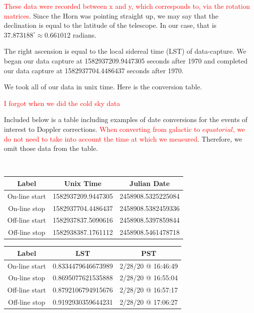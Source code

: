 \documentclass[12pt]{article}
\begin{document}
\textcolor{red}{These data were recorded between x and y, which corresponds to, via the rotation matrices}. Since the Horn was pointing straight up, we may say that the declination is equal to the latitude of the telescope. In our case, that is $37.873188^\circ \approx 0.661012$ radians.

The right ascension is equal to the local sidereal time (LST) of data-capture. We began our data capture at 1582937209.9447305 seconds after 1970 and completed our data capture at 1582937704.4486437 seconds after 1970.

We took all of our data in unix time. Here is the conversion table.

\textcolor{red}{I forgot when we did the cold sky data}

Included below is a table including examples of date conversions for the events of interest to Doppler corrections. \textcolor{red}{When converting from galactic to $equatorial$, we do not need to take into account the time at which we measured}. Therefore, we omit those data from the table. %

\

\begin{center}
 \begin{tabular}{||c c c||} 
 \hline
 Label & Unix Time & Julian Date \\ [0.5ex] 
 \hline
 On-line start & 1582937209.9447305 & 2458908.5325225084 \\ 
 \hline
 On-line stop & 1582937704.4486437 & 2458908.5382459336 \\
 \hline
 Off-line start & 1582937837.5090616 & 2458908.5397859844 \\
 \hline
 Off-line stop & 1582938387.1761112 & 2458908.5461478718 \\ [1ex] 
 \hline
\end{tabular}
\end{center}

\begin{center}
 \begin{tabular}{||c c c||} 
 \hline
 Label & LST & PST\\ [0.5ex] 
 \hline
 On-line start & 0.8334479646673989 & 2/28/20 @ 16:46:49 \\ 
 \hline
 On-line stop & 0.8695077621535888 & 2/28/20 @ 16:55:04 \\
 \hline
 Off-line start & 0.8792106794915676 & 2/28/20 @ 16:57:17 \\
 \hline
 Off-line stop & 0.9192930359644231 & 2/28/20 @ 17:06:27 \\ [1ex] 
 \hline
\end{tabular}
\end{center}
\end{document}
